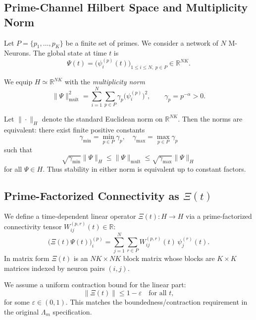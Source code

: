 \documentclass[11pt]{article}
\begin{document}
\subsection{Prime-Channel Hilbert Space and Multiplicity Norm}

Let \(P = \{p_1,\dots,p_K\}\) be a finite set of primes. We consider a network of \(N\) M-Neurons.
The global state at time \(t\) is
\[
\Psi(t) = \bigl(\psi_i^{(p)}(t)\bigr)_{1\le i\le N,\; p\in P} \in \mathbb{R}^{NK}.
\]

We equip \(H \simeq \mathbb{R}^{NK}\) with the \emph{multiplicity norm}
\begin{equation}
\label{eq:multiplicity-norm}
\|\Psi\|_{\mathrm{mult}}^2
= \sum_{i=1}^N \sum_{p\in P} \gamma_p \bigl(\psi_i^{(p)}\bigr)^2,
\qquad
\gamma_p = p^{-\alpha} > 0.
\end{equation}

Let \(\|\cdot\|_H\) denote the standard Euclidean norm on \(\mathbb{R}^{NK}\).
Then the norms are equivalent: there exist finite positive constants
\[
\gamma_{\min} = \min_{p\in P}\gamma_p, \quad \gamma_{\max} = \max_{p\in P}\gamma_p
\]
such that
\begin{equation}
\label{eq:norm-equivalence}
\sqrt{\gamma_{\min}}\|\Psi\|_H
\le \|\Psi\|_{\mathrm{mult}}
\le \sqrt{\gamma_{\max}}\|\Psi\|_H
\end{equation}
for all \(\Psi\in H\).
Thus stability in either norm is equivalent up to constant factors.

\subsection{Prime-Factorized Connectivity as \(\Xi(t)\)}

We define a time-dependent linear operator \(\Xi(t):H\to H\) via a prime-factorized connectivity tensor \(W_{ij}^{(p,r)}(t) \in \mathbb{R}\):
\begin{equation}
\label{eq:Xi-action}
\bigl(\Xi(t)\Psi(t)\bigr)_i^{(p)}
= \sum_{j=1}^N \sum_{r\in P} W_{ij}^{(p,r)}(t)\,\psi_j^{(r)}(t).
\end{equation}
In matrix form \(\Xi(t)\) is an \(NK\times NK\) block matrix whose blocks are \(K\times K\) matrices indexed by neuron pairs \((i,j)\).

We assume a uniform contraction bound for the linear part:
\begin{equation}
\label{eq:Xi-contraction}
\|\Xi(t)\| \le 1 - \varepsilon \quad \text{for all } t,
\end{equation}
for some \(\varepsilon\in(0,1)\).
This matches the boundedness/contraction requirement in the original \(\Lambda_m\) specification.
\end{document}
